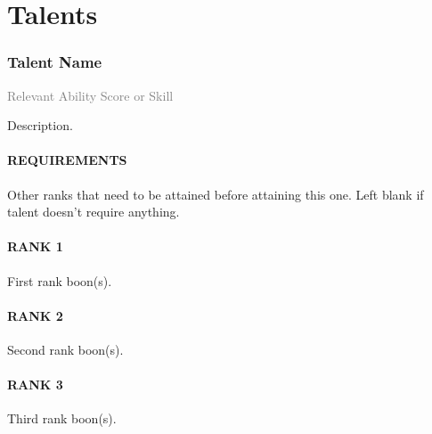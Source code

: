 \section{Talents}



\subsubsection{Talent Name}
\small{\textcolor{gray}{Relevant Ability Score or Skill}}

\normalsize
Description.
\paragraph{REQUIREMENTS} Other ranks that need to be attained before attaining this one.
Left blank if talent doesn't require anything.
\paragraph{RANK 1} First rank boon(s).
\paragraph{RANK 2} Second rank boon(s).
\paragraph{RANK 3} Third rank boon(s).

